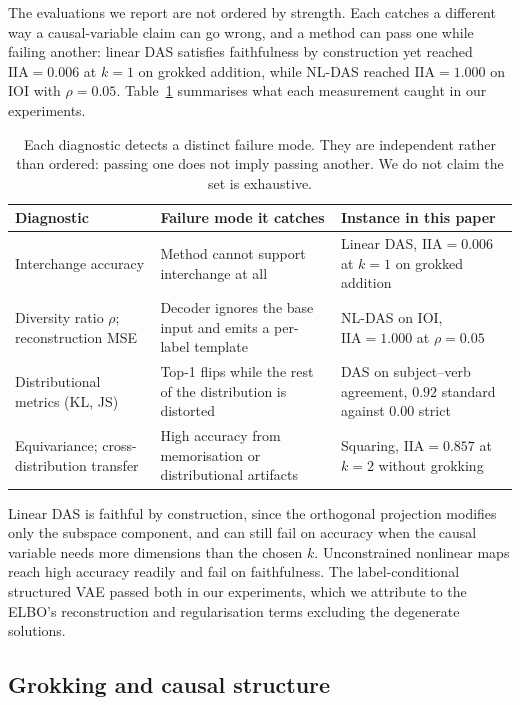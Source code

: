 \documentclass{article}
\newcommand{\IIA}{\mathrm{IIA}}
\begin{document}
The evaluations we report are not ordered by strength. Each catches a different
way a causal-variable claim can go wrong, and a method can pass one while failing
another: linear DAS satisfies faithfulness by construction yet reached
$\IIA = 0.006$ at $k = 1$ on grokked addition, while NL-DAS reached
$\IIA = 1.000$ on IOI with $\rho = 0.05$. Table~\ref{tab:diagnostics} summarises
what each measurement caught in our experiments.

\begin{table}[t]
\centering
\small
\setlength{\tabcolsep}{4pt}
\begin{tabular}{@{}p{3.1cm}p{4.6cm}p{5.6cm}@{}}
\toprule
Diagnostic & Failure mode it catches & Instance in this paper \\
\midrule
Interchange accuracy &
Method cannot support interchange at all &
Linear DAS, $\IIA = 0.006$ at $k{=}1$ on grokked addition \\
\addlinespace
Diversity ratio $\rho$; reconstruction MSE &
Decoder ignores the base input and emits a per-label template &
NL-DAS on IOI, $\IIA = 1.000$ at $\rho = 0.05$ \\
\addlinespace
Distributional metrics (KL, JS) &
Top-1 flips while the rest of the distribution is distorted &
DAS on subject--verb agreement, $0.92$ standard against $0.00$ strict \\
\addlinespace
Equivariance; cross-distribution transfer &
High accuracy from memorisation or distributional artifacts &
Squaring, $\IIA = 0.857$ at $k{=}2$ without grokking \\
\bottomrule
\end{tabular}
\caption{Each diagnostic detects a distinct failure mode. They are independent
rather than ordered: passing one does not imply passing another. We do not claim
the set is exhaustive.}
\label{tab:diagnostics}
\end{table}

Linear DAS is faithful by construction, since the orthogonal projection modifies
only the subspace component, and can still fail on accuracy when the causal
variable needs more dimensions than the chosen $k$. Unconstrained nonlinear maps
reach high accuracy readily and fail on faithfulness. The label-conditional
structured VAE passed both in our experiments, which we attribute to the ELBO's
reconstruction and regularisation terms excluding the degenerate solutions.

\subsection{Grokking and causal structure}
\end{document}
